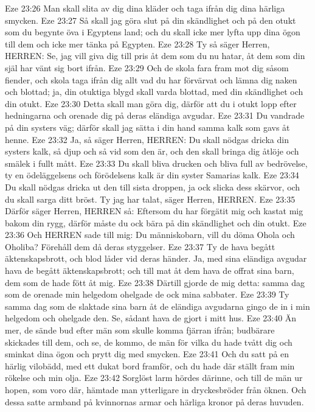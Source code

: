 Eze 23:26  Man skall slita av dig dina kläder och taga ifrån dig dina härliga smycken.
Eze 23:27  Så skall jag göra slut på din skändlighet och på den otukt som du begynte öva i Egyptens land; och du skall icke mer lyfta upp dina ögon till dem och icke mer tänka på Egypten.
Eze 23:28  Ty så säger Herren, HERREN: Se, jag vill giva dig till pris åt dem som du nu hatar, åt dem som din själ har vänt sig bort ifrån.
Eze 23:29  Och de skola fara fram mot dig såsom fiender, och skola taga ifrån dig allt vad du har förvärvat och lämna dig naken och blottad; ja, din otuktiga blygd skall varda blottad, med din skändlighet och din otukt.
Eze 23:30  Detta skall man göra dig, därför att du i otukt lopp efter hedningarna och orenade dig på deras eländiga avgudar.
Eze 23:31  Du vandrade på din systers väg; därför skall jag sätta i din hand samma kalk som gavs åt henne.
Eze 23:32  Ja, så säger Herren, HERREN: Du skall nödgas dricka din systers kalk, så djup och så vid som den är, och den skall bringa dig åtlöje och smälek i fullt mått.
Eze 23:33  Du skall bliva drucken och bliva full av bedrövelse, ty en ödeläggelsens och förödelsens kalk är din syster Samarias kalk.
Eze 23:34  Du skall nödgas dricka ut den till sista droppen, ja ock slicka dess skärvor, och du skall sarga ditt bröst. Ty jag har talat, säger Herren, HERREN.
Eze 23:35  Därför säger Herren, HERREN så: Eftersom du har förgätit mig och kastat mig bakom din rygg, därför måste du ock bära på din skändlighet och din otukt.
Eze 23:36  Och HERREN sade till mig: Du människobarn, vill du döma Ohola och Oholiba? Förehåll dem då deras styggelser.
Eze 23:37  Ty de hava begått äktenskapsbrott, och blod låder vid deras händer. Ja, med sina eländiga avgudar hava de begått äktenskapsbrott; och till mat åt dem hava de offrat sina barn, dem som de hade fött åt mig.
Eze 23:38  Därtill gjorde de mig detta: samma dag som de orenade min helgedom ohelgade de ock mina sabbater.
Eze 23:39  Ty samma dag som de slaktade sina barn åt de eländiga avgudarna gingo de in i min helgedom och ohelgade den. Se, sådant hava de gjort i mitt hus.
Eze 23:40  Än mer, de sände bud efter män som skulle komma fjärran ifrån; budbärare skickades till dem, och se, de kommo, de män för vilka du hade tvått dig och sminkat dina ögon och prytt dig med smycken.
Eze 23:41  Och du satt på en härlig vilobädd, med ett dukat bord framför, och du hade där ställt fram min rökelse och min olja.
Eze 23:42  Sorglöst larm hördes därinne, och till de män ur hopen, som voro där, hämtade man ytterligare in dryckesbröder från öknen. Och dessa satte armband på kvinnornas armar och härliga kronor på deras huvuden.
